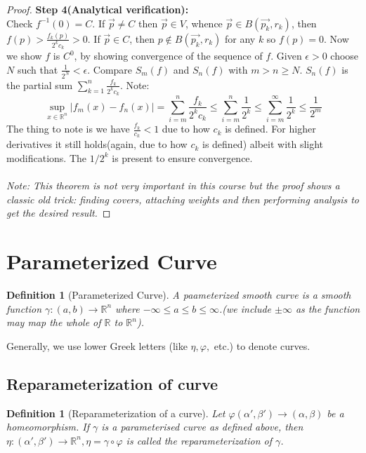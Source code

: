 \documentclass[oneside]{book}\twocolumn
\newtheorem{definition}[theorem]{Definition}
\begin{document}
\begin{proof}
\textbf{Step 4(Analytical verification): }\\
Check $f^{-1}(0)=C$. If $\overrightarrow{p}\ne C$ then $\overrightarrow{p}\in V$, whence $\overrightarrow{p}\in B(\overrightarrow{p_k},r_k)$, then $f(p)>\frac{f_k(p)}{2^kc_k}>0$. If  $\overrightarrow{p}\in C$, then $p\notin B(\overrightarrow{p_k},r_k)$ for any $k$ so $f(p)=0$. Now we show $f$ is $C^0$, by showing convergence of the sequence of $f$. Given $\epsilon>0$ choose $N$ such that $\frac{1}{2^N}<\epsilon$. Compare $S_m(f)$ and $S_n(f)$ with $m>n\geq N$. $S_n(f)$ is the partial sum $\sum_{k=1}^n \frac{f_k}{2^kc_k}$. Note:
$$\sup_{x\in \mathbb R^n}|f_m(x)-f_n(x)|=\sum_{i=m}^n \frac{f_k}{2^kc_k}\leq \sum_{i=m}^n \frac{1}{2^k}\leq \sum_{i=m}^\infty \frac{1}{2^k}\leq \frac{1}{2^{m}}$$
The thing to note is we have $\frac{f_k}{c_k}<1$ due to how $c_k$ is defined. For higher derivatives it still holds(again, due to how $c_k$ is defined) albeit with slight modifications. The $1/2^k$ is present to ensure convergence.\\\\
\textit{Note: This theorem is not very important in this course but the proof shows a classic old trick: finding covers, attaching weights and then performing analysis to get the desired result.}
\end{proof}




\section{Parameterized Curve}
\begin{definition}[Parameterized Curve]
A paameterized smooth curve is a smooth function $\gamma:(a,b)\to\mathbb R^n$ where $-\infty\leq a\leq b\leq \infty$.(we include $\pm\infty$ as the function may map the whole of $\mathbb R$ to $\mathbb R^n$).
\end{definition}
Generally, we use lower Greek letters (like $\eta,\varphi,$ etc.) to denote curves.
\subsection{Reparameterization of curve}
\begin{definition}[Reparameterization of a curve]
Let $\varphi(\alpha',\beta')\to(\alpha,\beta)$ be a homeomorphism.
If $\gamma$ is a parameterised curve as defined above, then $\eta:(\alpha',\beta')\to\mathbb R^n,\eta=\gamma\circ\varphi$ is called the reparameterization of $\gamma$.
\end{definition}
\end{document}
